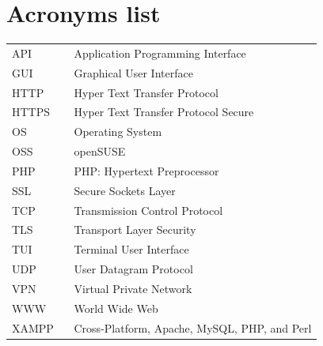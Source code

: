 \documentclass[11pt,a4paper]{report}
\begin{document}
\listoffigures
{}

\listoftables
{}

\lstlistoflistings
{}

\chapter*{Acronyms list}

    \begin{flushleft}
        \begin{tabular}{l p{0.8\linewidth}}
            API     & Application Programming Interface\\
            GUI     & Graphical User Interface\\
            HTTP    & Hyper Text Transfer Protocol\\
            HTTPS   & Hyper Text Transfer Protocol Secure\\
            OS      & Operating System\\
            OSS     & openSUSE\\
            PHP     & PHP: Hypertext Preprocessor\\
            SSL     & Secure Sockets Layer\\
            TCP     & Transmission Control Protocol\\
            TLS     & Transport Layer Security\\
            TUI     & Terminal User Interface\\ %
            UDP     & User Datagram Protocol\\
            VPN     & Virtual Private Network\\
            WWW     & World Wide Web\\
            XAMPP   & Cross-Platform, Apache, MySQL, PHP, and Perl
        \end{tabular}
    \end{flushleft}

\end{document}
